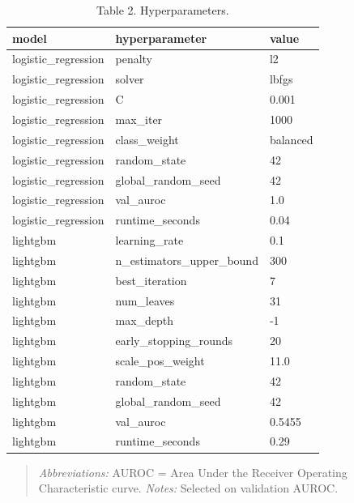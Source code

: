 \begin{table}[htbp]
\centering
\caption{Table 2. Hyperparameters.}
\label{table2_hyperparameters}
\begin{tabular}{lll}
\toprule
model & hyperparameter & value \\
\midrule
logistic\_regression & penalty & l2 \\
logistic\_regression & solver & lbfgs \\
logistic\_regression & C & 0.001 \\
logistic\_regression & max\_iter & 1000 \\
logistic\_regression & class\_weight & balanced \\
logistic\_regression & random\_state & 42 \\
logistic\_regression & global\_random\_seed & 42 \\
logistic\_regression & val\_auroc & 1.0 \\
logistic\_regression & runtime\_seconds & 0.04 \\
lightgbm & learning\_rate & 0.1 \\
lightgbm & n\_estimators\_upper\_bound & 300 \\
lightgbm & best\_iteration & 7 \\
lightgbm & num\_leaves & 31 \\
lightgbm & max\_depth & -1 \\
lightgbm & early\_stopping\_rounds & 20 \\
lightgbm & scale\_pos\_weight & 11.0 \\
lightgbm & random\_state & 42 \\
lightgbm & global\_random\_seed & 42 \\
lightgbm & val\_auroc & 0.5455 \\
lightgbm & runtime\_seconds & 0.29 \\
\bottomrule
\end{tabular}

\end{table}


\begin{quote}\small
\textit{Abbreviations:} AUROC = Area Under the Receiver Operating Characteristic curve.
\textit{Notes:} Selected on validation AUROC.
\end{quote}